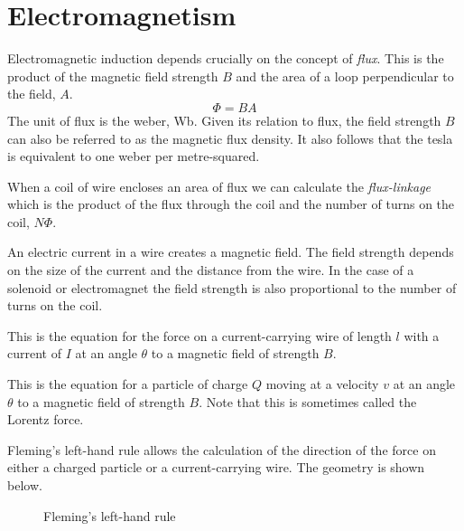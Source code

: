 \documentclass[main.tex]{subfiles}
\begin{document}
\chapter{Electromagnetism}

Electromagnetic induction depends crucially on the concept of \emph{flux}. This is the product of the magnetic field strength $B$ and the area of a loop perpendicular to the field, $A$.
\[ \Phi = BA \]
The unit of flux is the weber, Wb. Given its relation to flux, the field strength $B$ can also be referred to as the magnetic flux density. It also follows that the tesla is equivalent to one weber per metre-squared.

When a coil of wire encloses an area of flux we can calculate the \emph{flux-linkage} which is the product of the flux through the coil and the number of turns on the coil, $N\Phi$.


An electric current in a wire creates a magnetic field. The field strength depends on the size of the current and the distance from the wire. In the case of a solenoid or electromagnet the field strength is also proportional to the number of turns on the coil.


This is the equation for the force on a current-carrying wire of length $l$ with a current of $I$ at an angle $\theta$ to a magnetic field of strength $B$.


This is the equation for a particle of charge $Q$ moving at a velocity $v$ at an angle $\theta$ to a magnetic field of strength $B$. Note that this is sometimes called the Lorentz force.


Fleming's left-hand rule allows the calculation of the direction of the force on either a charged particle or a current-carrying wire. The geometry is shown below.

\begin{figure}[h]
  \begin{center}
  \end{center}
  \caption{Fleming's left-hand rule}
  \label{flemminglh}
\end{figure}
\end{document}
